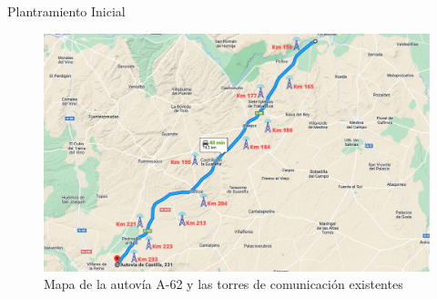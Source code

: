 Plantramiento Inicial

\begin{figure}[H]
    \centering
 	\includegraphics[width=\textwidth]{Imagenes/PlanteamientoInicial/torres_telefonia.pdf}
    \caption{Mapa de la autovía A-62 y las torres de comunicación existentes }
    \label{autovia}
\end{figure}